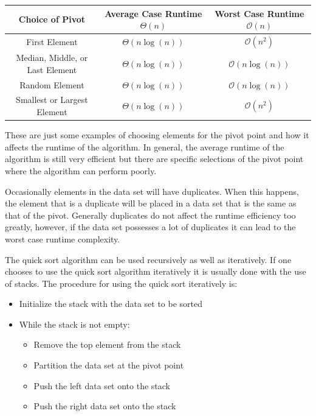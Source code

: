 \documentclass[a4paper,9pt]{article}
\begin{document}
\begin{center}
    \begin{tabular}{|c|c|c|}
        \hline \textbf{Choice of Pivot} & \textbf{Average Case Runtime $\Theta(n)$} & \textbf{Worst Case Runtime $\mathcal{O}(n)$} \\ \hline
        First Element & $\Theta(n\log{(n)})$ & $\mathcal{O}(n^2)$ \\ \hline
        Median, Middle, or Last Element & $\Theta(n\log{(n)})$ & $\mathcal{O}(n\log{(n)})$ \\ \hline
        Random Element & $\Theta(n\log{(n)})$ & $\mathcal{O}(n\log{(n)})$ \\ \hline
        Smallest or Largest Element & $\Theta(n\log{(n)})$ & $\mathcal{O}(n^2)$ \\ \hline
    \end{tabular}
\end{center}

\noindent These are just some examples of choosing elements for the pivot point and how it affects the runtime of the algorithm. In general, the average runtime of the algorithm is still very efficient but there are specific selections of the pivot point where the algorithm can perform poorly.

Occasionally elements in the data set will have duplicates. When this happens, the element that is a duplicate will be placed in a data set that is the same as that of the pivot. Generally duplicates do not affect the runtime efficiency too greatly, however, if the data set possesses a lot of duplicates it can lead to the worst case runtime complexity.

The quick sort algorithm can be used recursively as well as iteratively. If one chooses to use the quick sort algorithm iteratively it is usually done with the use of stacks. The procedure for using the quick sort iteratively is:

\begin{itemize}
    \item Initialize the stack with the data set to be sorted
    \item While the stack is not empty:
    \begin{itemize}
        \item Remove the top element from the stack
        \item Partition the data set at the pivot point
        \item Push the left data set onto the stack
        \item Push the right data set onto the stack
    \end{itemize}
\end{itemize}
\end{document}
